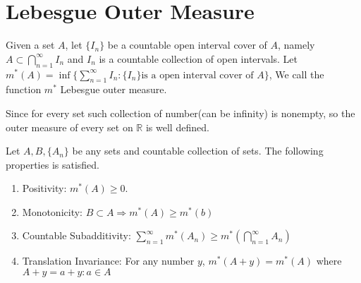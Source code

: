 \documentclass[lang=en, 12pt]{elegantbook}
\newcommand{\RR}{\mathbb{R}}
\begin{document}
        \section{Lebesgue Outer Measure}
            \begin{definition}
                Given a set $A$, let $\{I_n\}$ be a countable open interval cover of $A$, namely $A \subset \bigcap_{n=1}^{\infty}I_n$ and
            ${I_n}$ is a countable collection of open intervals. Let $m^*(A) = \inf\{\sum_{n=1}^{\infty}I_n:\{I_n\} \mbox{is a open interval cover of }A\}$,  
            We call the function $m^*$ Lebesgue outer measure. 
            \end{definition} %
            Since for every set such collection of number(can be infinity) is nonempty, so the outer measure of every set on $\RR$ is well defined. 
            \begin{proposition}
                Let $A,B,\{A_n\}$ be any sets and countable collection of sets. The following properties is satisfied.
            \begin{enumerate}
                \item Positivity: $m^*(A) \geq 0$.
                \item Monotonicity: $B \subset A \Rightarrow m^{*}(A) \geq m^{*}(b) $
                \item Countable Subadditivity: $\sum_{n=1}^{\infty} m^*(A_n) \geq m^*(\bigcap_{n=1}^{\infty}A_n)$
                \item Translation Invariance: For any number $y$, $m^*(A+y) = m^*(A)$ where $A+y = {a+y:a\in A}$ 
            \end{enumerate} 

            \end{proposition}
\end{document}
